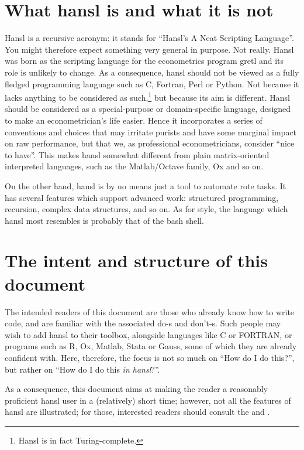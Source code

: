\documentclass[oneside]{book}
\begin{document}
\section*{What hansl is and what it is not}

Hansl is a recursive acronym: it stands for ``Hansl's A Neat Scripting
Language''. You might therefore expect something very general in
purpose. Not really.  Hansl was born as the scripting language for the
econometrics program gretl and its role is unlikely to change.  As a
consequence, hansl should not be viewed as a fully fledged programming
language such as C, Fortran, Perl or Python. Not because it lacks
anything to be considered as such,\footnote{Hansl is in fact
  Turing-complete.} but because its aim is different. Hansl should be
considered as a special-purpose or domain-specific language, designed
to make an econometrician's life easier. Hence it incorporates a
series of conventions and choices that may irritate purists and have
some marginal impact on raw performance, but that we, as professional
econometricians, consider ``nice to have''.  This makes hansl somewhat
different from plain matrix-oriented interpreted languages, such as
the Matlab/Octave family, Ox and so on.

On the other hand, hansl is by no means just a tool to automate rote
tasks. It has several features which support advanced work: structured
programming, recursion, complex data structures, and so on.  As for
style, the language which hansl most resembles is probably that of the
bash shell.

\section*{The intent and structure of this document}

The intended readers of this document are those who already know how
to write code, and are familiar with the associated do-s and don't-s.
Such people may wish to add hansl to their toolbox, alongside
languages like C or FORTRAN, or programs such as R, Ox, Matlab, Stata
or Gauss, some of which they are already confident with. Here,
therefore, the focus is not so much on ``How do I do this?'', but
rather on ``How do I do this \emph{in hansl}?''.

As a consequence, this document aims at making the reader a reasonably
proficient hansl user in a (relatively) short time; however, not all
the features of hansl are illustrated; for those, interested readers
should consult the \GCR{} and \GUG{}.
\end{document}
